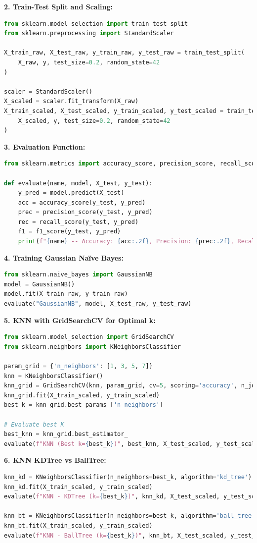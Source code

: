 \documentclass[12pt]{article}
\begin{document}
\textbf{2. Train-Test Split and Scaling:}
\begin{lstlisting}[language=Python]
from sklearn.model_selection import train_test_split
from sklearn.preprocessing import StandardScaler

X_train_raw, X_test_raw, y_train_raw, y_test_raw = train_test_split(
    X_raw, y, test_size=0.2, random_state=42
)

scaler = StandardScaler()
X_scaled = scaler.fit_transform(X_raw)
X_train_scaled, X_test_scaled, y_train_scaled, y_test_scaled = train_test_split(
    X_scaled, y, test_size=0.2, random_state=42
)
\end{lstlisting}

\textbf{3. Evaluation Function:}
\begin{lstlisting}[language=Python]
from sklearn.metrics import accuracy_score, precision_score, recall_score, f1_score, confusion_matrix, roc_curve, auc

def evaluate(name, model, X_test, y_test):
    y_pred = model.predict(X_test)
    acc = accuracy_score(y_test, y_pred)
    prec = precision_score(y_test, y_pred)
    rec = recall_score(y_test, y_pred)
    f1 = f1_score(y_test, y_pred)
    print(f"{name} -- Accuracy: {acc:.2f}, Precision: {prec:.2f}, Recall: {rec:.2f}, F1 Score: {f1:.2f}")
\end{lstlisting}

\textbf{4. Training Gaussian Na\"ive Bayes:}
\begin{lstlisting}[language=Python]
from sklearn.naive_bayes import GaussianNB
model = GaussianNB()
model.fit(X_train_raw, y_train_raw)
evaluate("GaussianNB", model, X_test_raw, y_test_raw)
\end{lstlisting}

\textbf{5. KNN with GridSearchCV for Optimal k:}
\begin{lstlisting}[language=Python]
from sklearn.model_selection import GridSearchCV
from sklearn.neighbors import KNeighborsClassifier

param_grid = {'n_neighbors': [1, 3, 5, 7]}
knn = KNeighborsClassifier()
knn_grid = GridSearchCV(knn, param_grid, cv=5, scoring='accuracy', n_jobs=-1)
knn_grid.fit(X_train_scaled, y_train_scaled)
best_k = knn_grid.best_params_['n_neighbors']

# Evaluate best K
best_knn = knn_grid.best_estimator_
evaluate(f"KNN (Best k={best_k})", best_knn, X_test_scaled, y_test_scaled)
\end{lstlisting}

\textbf{6. KNN KDTree vs BallTree:}
\begin{lstlisting}[language=Python]
knn_kd = KNeighborsClassifier(n_neighbors=best_k, algorithm='kd_tree')
knn_kd.fit(X_train_scaled, y_train_scaled)
evaluate(f"KNN - KDTree (k={best_k})", knn_kd, X_test_scaled, y_test_scaled)

knn_bt = KNeighborsClassifier(n_neighbors=best_k, algorithm='ball_tree')
knn_bt.fit(X_train_scaled, y_train_scaled)
evaluate(f"KNN - BallTree (k={best_k})", knn_bt, X_test_scaled, y_test_scaled)
\end{lstlisting}
\end{document}
